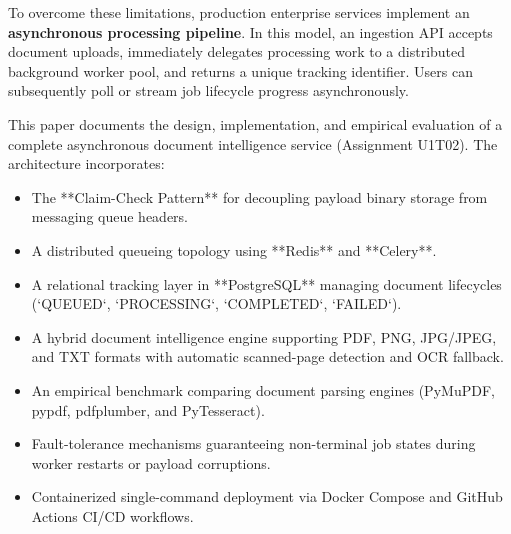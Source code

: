 \documentclass[peerreviewca]{IEEEtran}
\begin{document}
To overcome these limitations, production enterprise services implement an \textbf{asynchronous processing pipeline}. In this model, an ingestion API accepts document uploads, immediately delegates processing work to a distributed background worker pool, and returns a unique tracking identifier. Users can subsequently poll or stream job lifecycle progress asynchronously.

This paper documents the design, implementation, and empirical evaluation of a complete asynchronous document intelligence service (Assignment U1T02). The architecture incorporates:
\begin{itemize}
    \item The **Claim-Check Pattern** for decoupling payload binary storage from messaging queue headers.
    \item A distributed queueing topology using **Redis** and **Celery**.
    \item A relational tracking layer in **PostgreSQL** managing document lifecycles (`QUEUED`, `PROCESSING`, `COMPLETED`, `FAILED`).
    \item A hybrid document intelligence engine supporting PDF, PNG, JPG/JPEG, and TXT formats with automatic scanned-page detection and OCR fallback.
    \item An empirical benchmark comparing document parsing engines (PyMuPDF, pypdf, pdfplumber, and PyTesseract).
    \item Fault-tolerance mechanisms guaranteeing non-terminal job states during worker restarts or payload corruptions.
    \item Containerized single-command deployment via Docker Compose and GitHub Actions CI/CD workflows.
\end{itemize}
\end{document}
